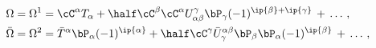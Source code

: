 \begin{equation}
\begin{aligned}
\label{eq:Omega-exp}
\Omega&={\Omega}^1=\cC^\alpha {T}_\alpha
+
\half \cC^\beta \cC^\alpha {U}^\gamma_{\alpha\beta}\bP_\gamma
(-1)^{\ip{\beta}+\ip{\gamma}}
\,+\,\ldots\,,
\\
\bar\Omega&=
{\Omega}^2
=
{\bar{T}}^\alpha \bP_\alpha(-1)^{\ip{\alpha}}
+
\half \cC^\gamma {\bar{U}}^{\alpha\beta}_\gamma
\bP_\beta \bP_\alpha(-1)^{\ip{\beta}}
\,+\,\ldots\,,
\end{aligned}
\end{equation}

